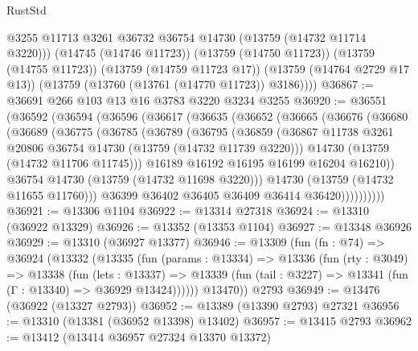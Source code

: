 \begin{lexlean}{RustStd}
\begin{coremodule}
          @3255
          @11713
          @3261
          @36732
          @36754
          @14730
          (@13759 (@14732 @11714 @3220)))
        (@14745 (@14746 @11723))
        (@13759 (@14750 @11723))
        (@13759 (@14755 @11723))
        (@13759 (@14759 @11723 @17))
        (@13759 (@14764 @2729 @17 @13))
        (@13759 (@13760 (@13761 (@14770 @11723)) @3186))))
@36867 := @36691 @266 @103 @13 @16 @3783 @3220 @3234 @3255
@36920 := @36551
    (@36592
      (@36594
        (@36596
          (@36617
            (@36635
              (@36652
                (@36665
                  (@36676
                    (@36680
                      (@36689
                        (@36775
                          (@36785
                            (@36789
                              (@36795
                                (@36859
                                  (@36867
                                    @11738
                                    @3261
                                    @20806
                                    @36754
                                    @14730
                                    (@13759 (@14732 @11739 @3220)))
                                  @14730
                                  (@13759 (@14732 @11706 @11745)))
                                @16189
                                @16192
                                @16195
                                @16199
                                @16204
                                @16210))
                            @36754
                            @14730
                            (@13759 (@14732 @11698 @3220)))
                          @14730
                          (@13759 (@14732 @11655 @11760)))
                        @36399
                        @36402
                        @36405
                        @36409
                        @36414
                        @36420))))))))))
@36921 := @13306 @1104
@36922 := @13314 @27318
@36924 := @13310 (@36922 @13329)
@36926 := @13352 (@13353 @1104)
@36927 := @13348 @36926
@36929 := @13310 (@36927 @13377)
@36946 := @13309
    (fun (fn : @74) =>
    @36924
      (@13332
        (@13335
          (fun (params : @13334) =>
          @13336
            (fun (rty : @3049) =>
            @13338
              (fun (lets : @13337) =>
              @13339 (fun (tail : @3227) => @13341 (fun (Γ : @13340) => @36929 @13424))))))
        @13470))
    @2793
@36949 := @13476 (@36922 (@13327 @2793))
@36952 := @13389 (@13390 @2793) @27321
@36956 := @13310 (@13381 (@36952 @13398) @13402)
@36957 := @13415 @2793
@36962 := @13412 (@13414 @36957 @27324 @13370 @13372)

\end{coremodule}
\end{lexlean}

